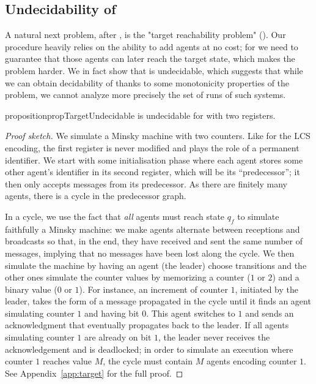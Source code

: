 \subsection{Undecidability of \TARGET}
\label{sec:undec-target}

A natural next problem, after \COVER, is the "target reachability problem" (\TARGET).  
Our \COVER procedure heavily relies on the ability to add agents at no cost; for \TARGET we need to guarantee that those agents can later reach the target state, which makes the problem harder. 
We in fact show that \TARGET is undecidable, which suggests that while we can obtain decidability of \COVER thanks to some monotonicity properties of the problem, we cannot analyze more precisely the set of runs of such systems.

\begin{restatable}{proposition}{propTargetUndecidable}
\label{prop:target-undec}
\TARGET is undecidable for \BNRA with two registers.
\end{restatable}

\begin{proof}[Proof sketch]
We simulate a Minsky machine with two counters. Like for the LCS encoding, the first register is never modified and plays the role of a permanent identifier. We start with some initialisation phase where each agent stores some other agent's identifier in its second register, which will be its ``predecessor''; it then only accepts messages from its predecessor. As there are finitely many agents, there is a cycle in the predecessor graph. 

In a cycle, we use the fact that \emph{all} agents must reach state $q_f$ to simulate faithfully a Minsky machine: we make agents alternate between receptions and broadcasts so that, in the end, they have received and sent the same number of messages, implying that no messages have been lost along the cycle.
We then simulate the machine by having an agent (the leader) choose transitions and the other ones simulate the counter values by memorizing a counter ($1$ or $2$) and a binary value ($0$ or $1$). For instance, an increment of counter $1$, initiated by the leader, takes the form of a message propagated in the cycle until it finds an agent simulating counter $1$ and having bit $0$. This agent switches to $1$ and sends an acknowledgment that eventually propagates back to the leader. If all agents simulating counter $1$ are already on bit $1$, the leader never receives the acknowledgement and is deadlocked; in order to simulate an execution where counter $1$ reaches value $M$, the cycle must contain $M$ agents encoding counter $1$. See Appendix~\ref{app:target} for the full proof. 
\end{proof}
